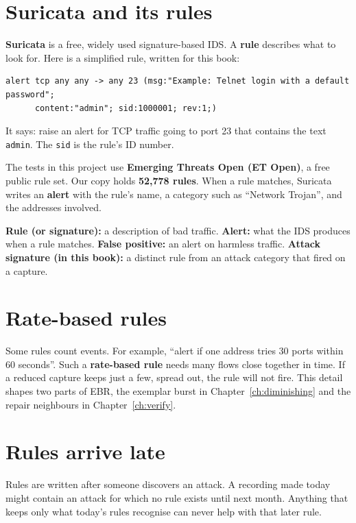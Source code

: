 \section{Suricata and its rules}
\textbf{Suricata} is a free, widely used signature-based IDS. A \textbf{rule} describes what to look for. Here is a simplified rule, written for this book:
\begin{lstlisting}
alert tcp any any -> any 23 (msg:"Example: Telnet login with a default password";
      content:"admin"; sid:1000001; rev:1;)
\end{lstlisting}
It says: raise an alert for TCP traffic going to port 23 that contains the text \texttt{admin}. The \texttt{sid} is the rule's ID number.

The tests in this project use \textbf{Emerging Threats Open (ET Open)}, a free public rule set. Our copy holds \textbf{52,778 rules}. When a rule matches, Suricata writes an \textbf{alert} with the rule's name, a category such as ``Network Trojan'', and the addresses involved.

\begin{newword}
\textbf{Rule (or signature):} a description of bad traffic. \textbf{Alert:} what the IDS produces when a rule matches. \textbf{False positive:} an alert on harmless traffic. \textbf{Attack signature (in this book):} a distinct rule from an attack category that fired on a capture.
\end{newword}

\section{Rate-based rules}
Some rules count events. For example, ``alert if one address tries 30 ports within 60 seconds''. Such a \textbf{rate-based rule} needs many flows close together in time. If a reduced capture keeps just a few, spread out, the rule will not fire. This detail shapes two parts of EBR, the exemplar burst in Chapter~\ref{ch:diminishing} and the repair neighbours in Chapter~\ref{ch:verify}.

\section{Rules arrive late}
\begin{bigidea}
Rules are written after someone discovers an attack. A recording made today might contain an attack for which no rule exists until next month. Anything that keeps only what today's rules recognise can never help with that later rule.
\end{bigidea}

